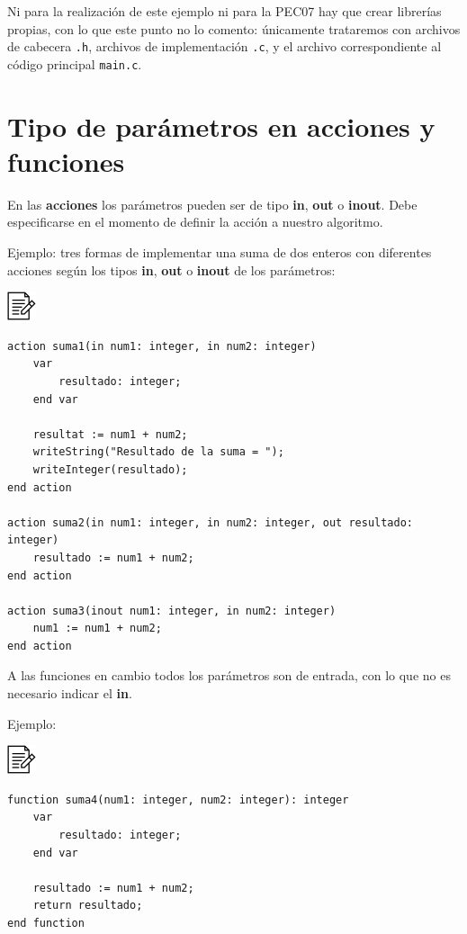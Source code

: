 \documentclass[
]{book}
\begin{document}
Ni para la realización de este ejemplo ni para la PEC07 hay que crear librerías propias, con lo que este punto no lo comento: únicamente trataremos con archivos de cabecera \texttt{.h}, archivos de implementación \texttt{.c}, y el archivo correspondiente al código principal \texttt{main.c}.

\hypertarget{tipo-de-paruxe1metros-en-acciones-y-funciones}{%
\section{Tipo de parámetros en acciones y funciones}\label{tipo-de-paruxe1metros-en-acciones-y-funciones}}

En las \textbf{acciones} los parámetros pueden ser de tipo \textbf{in}, \textbf{out} o \textbf{inout}. Debe especificarse en el momento de definir la acción a nuestro algoritmo.

Ejemplo: tres formas de implementar una suma de dos enteros con diferentes acciones según los tipos \textbf{in}, \textbf{out} o \textbf{inout} de los parámetros:

\includegraphics{./img/alg.png}

\begin{verbatim}
action suma1(in num1: integer, in num2: integer)
    var
        resultado: integer;
    end var

    resultat := num1 + num2;
    writeString("Resultado de la suma = ");
    writeInteger(resultado);
end action

action suma2(in num1: integer, in num2: integer, out resultado: integer)
    resultado := num1 + num2;
end action

action suma3(inout num1: integer, in num2: integer)
    num1 := num1 + num2;
end action
\end{verbatim}

A las funciones en cambio todos los parámetros son de entrada, con lo que no es necesario indicar el \textbf{in}.

Ejemplo:

\includegraphics{./img/alg.png}

\begin{verbatim}
function suma4(num1: integer, num2: integer): integer
    var
        resultado: integer;
    end var

    resultado := num1 + num2;
    return resultado;
end function
\end{verbatim}
\end{document}
